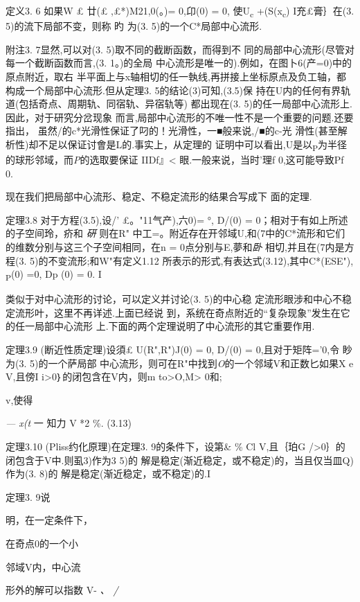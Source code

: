 \documentclass{article}
\begin{document}
定义3. 6 如果W £ 廿(£ ,£*)M21,0(。)= 0,卬(0) = 0, 使U\textsubscript{c}
+(S(x\textsubscript{c}) I充£膏｝在(3. 5)的流下局部不变，则称 旳 为(3.
5)的一个C*局部中心流形.

附注3. 7显然,可以对(3. 5)取不同的截断函数，而得到不
同的局部中心流形(尽管对每一个截断函数而言,(3. 1。)的全局
中心流形是唯一的).例如，在图卜6(产=0)中的原点附近，取右
半平面上与x轴相切的任一執线,再拼接上坐标原点及负工轴，都
构成一个局部中心流形.但从定理3. 5的结论(3)可知,(3.5)保
持在U内的任何有界轨道(包括奇点、周期轨、同宿轨、异宿轨等) 都出现在(3.
5)的任一局部中心流形上.因此，对于研究分岔现象
而言,局部中心流形的不唯一性不是一个重要的问题.还要指出，
虽然/的c*光滑性保证了叼的！光滑性，一■般来说,/■的c-光
滑性(甚至解析性)却不足以保证讨會是L的.事实上，从定理的
证明中可以看出,U是以\textsubscript{P}为半径的球形邻域，而\emph{P}的选取要保证
IIDf』\textless{} 眼.一般来说，当时'理f 0,这可能导致Pf 0.

现在我们把局部中心流形、稳定、不稳定流形的结果合写成下 面的定理.

定理3.8 对于方程(3.5),设/' £。"11气产),六0)= °, D/(0) =
0；相对于有如上所述的子空间玲，疥和 \emph{硏} 则在R"
中工=。附近存在开邻域U,和(7中的C*流形和它们
的维数分别与这三个子空间相同，在n = 0点分别与E,夢和\emph{卧}
相切,并且在(7内是方程(3. 5)的不变流形;和W"有定义1.12
所表示的形式,有表达式(3.12),其中C*(ESE"), \textsubscript{P}(0) =0, Dp
(0) = 0. I

类似于对中心流形的讨论，可以定义并讨论(3. 5)的中心稳
定流形眼涉和中心不稳定流形叶，这里不再详述.上面已经说
到，系统在奇点附近的``复杂现象''发生在它的任一局部中心流形
上.下面的两个定理说明了中心流形的其它重要作用.

定理3.9 (断近性质定理)设須£ U(R",R")J(0) = 0, D/(0) = 0,且对于矩阵='0,令
眇为(3. 5)的一个萨局部
中心流形，则可在R"中找到\emph{O}的一个邻域V和正数匕如果X e V,且傍I
i\textgreater{}0｝的闭包含在V内，则m to\textgreater{}O,M\textgreater{}
0和;

v,使得

\emph{--- x(t} 一 知力 \textbar{} V *2 \%. (3.13)

定理3.10 (Pliss约化原理)在定理3. 9的条件下，设第\& \% Cl V,且｛珀G
\textbar{}/\textgreater{}0｝的闭包含于V中.则虱3)作为3 5)的
解是稳定(渐近稳定，或不稳定)的，当且仅当皿Q)作为(3. 8)的
解是稳定(渐近稳定，或不稳定)的.I

定理3. 9说

明，在一定条件下，

在奇点0的一个小

邻域V内，中心流

形外的解可以指数 V- \emph{、 /}
\end{document}

